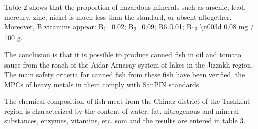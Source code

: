 Table 2 shows that the proportion of hazardous minerals such as arsenic,
lead, mercury, zinc, nickel is much less than the standard, or absent
altogether. Moreover, B vitamins appear: B\textsubscript{1}=0.02;
B\textsubscript{2}=0.09; B6 0.01; B\textsubscript{12}
\textbackslash u003d 0.08 mg / 100 g.

The conclusion is that it is possible to produce canned fish in oil and
tomato sauce from the roach of the Aidar-Arnasay system of lakes in the
Jizzakh region. The main safety criteria for canned fish from these fish
have been verified, the MPCs of heavy metals in them comply with SanPIN
standards

The chemical composition of fish meat from the Chinaz district of the
Tashkent region is characterized by the content of water, fat,
nitrogenous and mineral substances, enzymes, vitamins, etc. som and the
results are entered in table 3.

